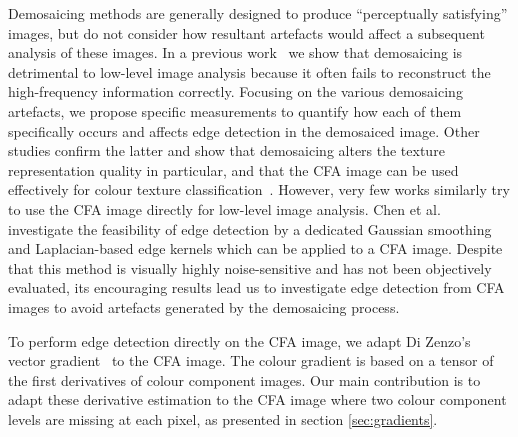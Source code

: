 \documentclass[twoside]{article}
\begin{document}

Demosaicing methods are generally designed to produce ``perceptually satisfying'' images, but do not consider how resultant artefacts would affect a subsequent analysis of these images. In a previous work~\cite{losson_aiep_2010} we show that demosaicing is detrimental to low-level image analysis because it often fails to reconstruct the high-frequency information correctly. Focusing on the various demosaicing artefacts, we propose specific measurements to quantify how each of them specifically occurs and affects edge detection in the demosaiced image. Other studies confirm the latter and show that demosaicing alters the texture representation quality in particular, and that the CFA image can be used effectively for colour texture classification~\cite{losson_ietip_2012, losson_cviu_2013}. However, very few works similarly try to use the CFA image directly for low-level image analysis. Chen et al.~\cite{chen_apccas_2006} investigate the feasibility of edge detection by a dedicated Gaussian smoothing and Laplacian-based edge kernels which can be applied to a CFA image. Despite that this method is visually highly noise-sensitive and has not been objectively evaluated, its encouraging results lead us to investigate edge detection from CFA images to avoid artefacts generated by the demosaicing process. 

To perform edge detection directly on the CFA image, we adapt Di Zenzo's vector gradient~\cite{zenzo_cvgip_1986} to the CFA image. The colour gradient is based on a tensor of the first derivatives of colour component images. Our main contribution is to adapt these derivative estimation to the CFA image where two colour component levels are missing at each pixel, as presented in section \ref{sec:gradients}.
\end{document}
